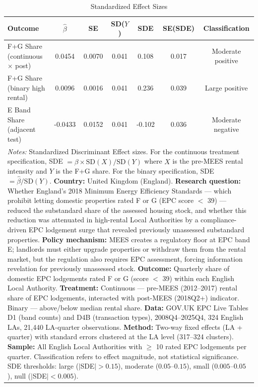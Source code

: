 \begin{table}[t]
\centering
\caption{Standardized Effect Sizes}
\label{tab:sde}
\footnotesize
\begin{tabular}{p{3.8cm}cccccc}
\hline\hline
Outcome & $\hat{\beta}$ & SE & SD($Y$) & SDE & SE(SDE) & Classification \\
\hline
F+G Share (continuous $\times$ post) & 0.0454 & 0.0070 & 0.041 & 0.108 & 0.017 & Moderate positive \\
F+G Share (binary high rental) & 0.0096 & 0.0016 & 0.041 & 0.236 & 0.039 & Large positive \\
E Band Share (adjacent test) & -0.0433 & 0.0152 & 0.041 & -0.102 & 0.036 & Moderate negative \\
\hline\hline
\multicolumn{7}{p{0.95\textwidth}}{\scriptsize \textit{Notes:}  Standardized Discriminant Effect sizes. For the continuous treatment specification,  SDE $= \hat{\beta} \times \text{SD}(X) / \text{SD}(Y)$ where $X$ is the pre-MEES  rental intensity and $Y$ is the F+G share. For the binary specification,  SDE $= \hat{\beta} / \text{SD}(Y)$.  \textbf{Country:} United Kingdom (England).  \textbf{Research question:} Whether England's 2018 Minimum Energy Efficiency  Standards --- which prohibit letting domestic properties rated F or G (EPC score $<$ 39)  --- reduced the substandard share of the assessed housing stock, and whether this  reduction was attenuated in high-rental Local Authorities by a compliance-driven  EPC lodgement surge that revealed previously unassessed substandard properties.  \textbf{Policy mechanism:} MEES creates a regulatory floor at EPC band E; landlords  must either upgrade properties or withdraw them from the rental market, but the regulation  also requires EPC assessment, forcing information revelation for previously unassessed stock.  \textbf{Outcome:} Quarterly share of domestic EPC lodgements rated F or G (score $<$ 39)  within each English Local Authority.  \textbf{Treatment:} Continuous --- pre-MEES (2012--2017) rental share of EPC lodgements,  interacted with post-MEES (2018Q2+) indicator. Binary --- above/below median rental share.  \textbf{Data:} GOV.UK EPC Live Tables D1 (band counts) and D4B (transaction types),  2008Q4--2025Q4, 324 English LAs, 21,440 LA-quarter observations.  \textbf{Method:} Two-way fixed effects (LA + quarter) with standard errors clustered at  the LA level (317--324 clusters).  \textbf{Sample:} All English Local Authorities with $\geq$ 10 rated EPC lodgements per quarter.  Classification refers to effect magnitude, not statistical significance.  SDE thresholds: large ($|$SDE$| > 0.15$), moderate ($0.05$--$0.15$), small ($0.005$--$0.05$),  null ($|$SDE$| < 0.005$).}
\end{tabular}
\end{table}
